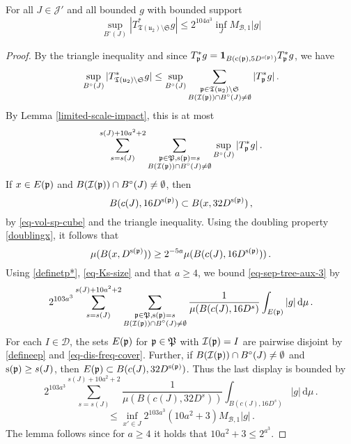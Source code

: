 {    \begin{lemma}
        \label{local-tree-control}
        For all $J \in \mathcal{J}'$ and all bounded $g$ with bounded support
        $$
            \sup_{B^\circ{}(J)} |T_{\mathfrak{T}(\mathfrak{u}_2)\setminus\mathfrak{S}}^* g| \le 2^{104a^3} \inf_J M_{\mathcal{B},1}|g|
        $$
    \end{lemma}

    \begin{proof}
        By the triangle inequality and since $T_{{\mathfrak p}}^* g = \mathbf{1}_{B({\mathrm{c}}({\mathfrak p}), 5D^{{\mathrm{s}}({\mathfrak p})})} T_{{\mathfrak p}}^* g$, we have
        $$
            \sup_{B^\circ{}(J)} |T_{{\mathfrak T}({\mathfrak u}_2) \setminus\mathfrak{S}}^* g|
            \leq \sup_{B^\circ{}(J)} \sum_{\substack{{\mathfrak p} \in {\mathfrak T}({\mathfrak u}_2) \setminus \mathfrak{S}\\ B({\mathcal{I}}({\mathfrak p})) \cap B^\circ(J)  \ne \emptyset}} |T_{{\mathfrak p}}^*g|\,.
        $$
        By Lemma \ref{limited-scale-impact}, this is at most
        \begin{equation}
            \label{eq-sep-tree-aux-3}
            \sum_{s = s(J)}^{s(J) + 10a^2 + 2} \sum_{\substack{{\mathfrak p} \in {\mathfrak P}, {\mathrm{s}}({\mathfrak p}) = s\\ B({\mathcal{I}}({\mathfrak p})) \cap B^\circ(J)  \ne \emptyset}} \sup_{B^\circ{}(J)} |T_{{\mathfrak p}}^* g|\,.
        \end{equation}
        If $x \in E({\mathfrak p})$ and $B({\mathcal{I}}({\mathfrak p})) \cap B^\circ(J)  \ne \emptyset$, then
        $$
            B(c(J), 16D^{{\mathrm{s}}({\mathfrak p})}) \subset B(x, 32 D^{{\mathrm{s}}({\mathfrak p})})\,,
        $$
        by \eqref{eq-vol-sp-cube} and the triangle inequality. Using the doubling property \eqref{doublingx}, it follows that
        $$
            \mu(B(x, D^{{\mathrm{s}}({\mathfrak p})})) \ge 2^{-5a} \mu(B(c(J), 16D^{{\mathrm{s}}({\mathfrak p})}))\,.
        $$
        Using \eqref{definetp*}, \eqref{eq-Ks-size} and that $a \ge 4$, we bound \eqref{eq-sep-tree-aux-3}  by
        $$
            2^{103a^3}\sum_{s = s(J)}^{s(J) + 10a^2 + 2} \sum_{\substack{{\mathfrak p} \in {\mathfrak P}, {\mathrm{s}}({\mathfrak p}) = s\\B({\mathcal{I}}({\mathfrak p})) \cap B^\circ(J)  \ne \emptyset}} \frac{1}{\mu(B(c(J), 16 D^s)} \int_{E({\mathfrak p})} |g| \, \mathrm{d}\mu\,.
        $$
        For each $I \in \mathcal{D}$, the sets $E({\mathfrak p})$ for ${\mathfrak p} \in {\mathfrak P}$ with ${\mathcal{I}}({\mathfrak p}) = I$ are pairwise disjoint by \eqref{defineep} and \eqref{eq-dis-freq-cover}. Further, if $B({\mathcal{I}}({\mathfrak p})) \cap B^\circ(J)  \ne \emptyset$ and ${\mathrm{s}}({\mathfrak p}) \ge s(J)$, then $E({\mathfrak p}) \subset B(c(J), 32 D^{{\mathrm{s}}({\mathfrak p})})$. Thus the last display is bounded by
        $$
            2^{103a^3}\sum_{s = s(J)}^{s(J) + 10a^2 + 2}  \frac{1}{\mu(B(c(J), 32 D^s))} \int_{B(c(J), 16 D^s)} |g| \, \mathrm{d}\mu\,.
        $$
        $$
            \le \inf_{x' \in J} 2^{103a^3}(10a^2 + 3) M_{\mathcal{B}, 1} |g|\,.
        $$
        The lemma follows since for $a \ge 4$ it holds that $10a^2 + 3 \le 2^{a^3}$.
    \end{proof}

}
